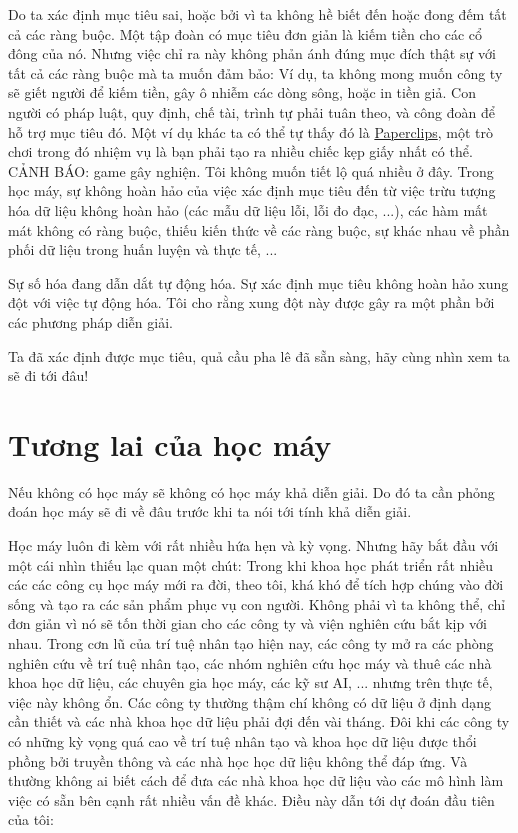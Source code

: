 Do ta xác định mục tiêu sai, hoặc bởi vì ta không hề biết đến hoặc đong đếm tất cả các ràng buộc. Một tập đoàn có mục tiêu đơn giản là kiếm tiền cho các cổ đông của nó. Nhưng việc chỉ ra này không phản ánh đúng mục đích thật sự với tất cả các ràng buộc mà ta muốn đảm bảo: Ví dụ, ta không mong muốn công ty sẽ giết người để kiếm tiền, gây ô nhiễm các dòng sông, hoặc in tiền giả. Con người có  pháp luật, quy định, chế tài, trình tự phải tuân theo, và công đoàn để hỗ trợ mục tiêu đó. Một ví dụ khác ta có thể tự thấy đó là \href{http://www.decisionproblem.com/paperclips/index2.html}{Paperclips}, một trò chơi trong đó nhiệm vụ là bạn phải tạo ra nhiều chiếc kẹp giấy nhất có thể. CẢNH BÁO: game gây nghiện. Tôi không muốn tiết lộ quá nhiều ở đây. Trong học máy, sự không hoàn hảo của việc xác định mục tiêu đến từ việc trừu tượng hóa dữ liệu không hoàn hảo (các mẫu dữ liệu lỗi, lỗi đo đạc, ...), các hàm mất mát không có ràng buộc, thiếu kiến thức về các ràng buộc, sự khác nhau về phần phối dữ liệu trong huấn luyện và thực tế, ...

Sự số hóa đang dẫn dắt tự động hóa. Sự xác định mục tiêu không hoàn hảo xung đột với việc tự động hóa. Tôi cho rằng xung đột này được gây ra một phần bởi các phương pháp diễn giải.

Ta đã xác định được mục tiêu, quả cầu pha lê đã sẵn sàng, hãy cùng nhìn xem ta sẽ đi tới đâu!

\clearpage
\section{Tương lai của học máy}
Nếu không có học máy sẽ không có học máy khả diễn giải. Do đó ta cần phỏng đoán học máy sẽ đi về đâu trước khi ta nói tới tính khả diễn giải.

Học máy luôn đi kèm với rất nhiều hứa hẹn và kỳ vọng. Nhưng hãy bắt đầu với một cái nhìn thiếu lạc quan một chút: Trong khi khoa học phát triển rất nhiều các các công cụ học máy mới ra đời, theo tôi, khá khó để tích hợp chúng vào đời sống và tạo ra các sản phẩm phục vụ con người. Không phải vì ta không thể, chỉ đơn giản vì nó sẽ tốn thời gian cho các công ty và viện nghiên cứu bắt kịp với nhau. Trong cơn lũ của trí tuệ nhân tạo hiện nay, các công ty mở ra các phòng nghiên cứu về trí tuệ nhân tạo, các nhóm nghiên cứu học máy và thuê các nhà khoa học dữ liệu, các chuyên gia học máy, các kỹ sư AI, ... nhưng trên thực tế, việc này không ổn. Các công ty thường thậm chí không có dữ liệu ở định dạng cần thiết và các nhà khoa học dữ liệu phải đợi đến vài tháng. Đôi khi các công ty có những kỳ vọng quá cao về trí tuệ nhân tạo và khoa học dữ liệu được thổi phồng bởi truyền thông và các nhà học học dữ liệu không thể đáp ứng. Và thường không ai biết cách để đưa các nhà khoa học dữ liệu vào các mô hình làm việc có sẵn bên cạnh rất nhiều vấn đề khác. Điều này dẫn tới dự đoán đầu tiên của tôi:

